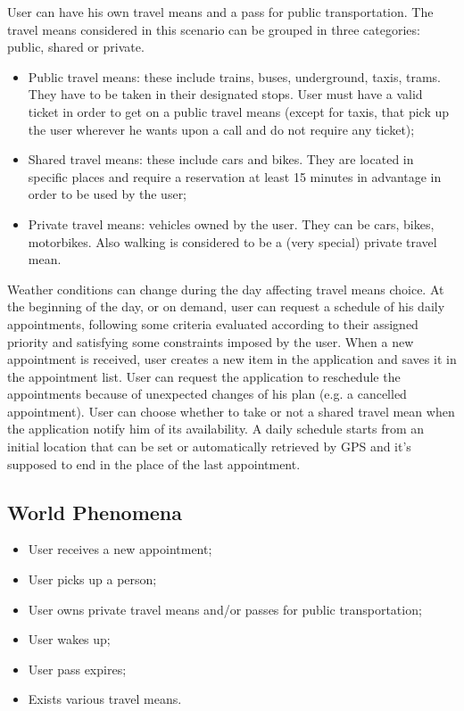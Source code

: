 User can have his own travel means and a pass for public transportation. 
The travel means considered in this scenario can be grouped in three categories: public, shared or private.
\begin{itemize}
\item Public travel means: these include trains, buses, underground, taxis, trams. They have to be taken in their designated stops. User must have a valid ticket in order to get on a public travel means (except for taxis, that pick up the user wherever he wants upon a call and do not require any ticket);

\item Shared travel means: these include cars and bikes. They are located in specific places and require a reservation at least 15 minutes in advantage in order to be used by the user;

\item Private travel means: vehicles owned by the user. They can be cars, bikes, motorbikes. Also walking is considered to be a (very special) private travel mean.
\end{itemize}

Weather conditions can change during the day affecting travel means choice.
At the beginning of the day, or on demand, user can request a schedule of his daily appointments, following some criteria evaluated according to their assigned priority and satisfying some constraints imposed by the user.
When a new appointment is received, user creates a new item in the application and saves it in the appointment list. User can request the application to reschedule the appointments because of unexpected changes of his plan (e.g. a cancelled appointment).
User can choose whether to take or not a shared travel mean when the application notify him of its availability.
A daily schedule starts from an initial location that can be set or automatically retrieved by GPS and it's supposed to end in the place of the last appointment. 

\subsection{World Phenomena}
\begin{itemize}
\item User receives a new appointment;
\item User picks up a person;
\item User owns private travel means and/or passes for public transportation;
\item User wakes up;
\item User pass expires;
\item Exists various travel means.
\end{itemize}

